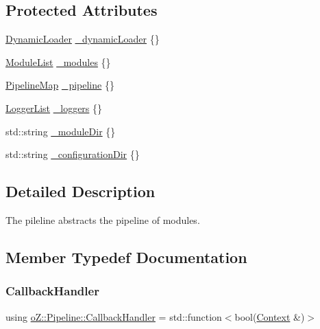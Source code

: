 \subsection*{Protected Attributes}
\begin{DoxyCompactItemize}
\item 
\mbox{\hyperlink{classo_z_1_1_dynamic_loader}{Dynamic\+Loader}} \mbox{\hyperlink{classo_z_1_1_pipeline_a6412859211177d78f0eebcecda79e841}{\+\_\+dynamic\+Loader}} \{\}
\item 
\mbox{\hyperlink{classo_z_1_1_pipeline_a3bb478d291a83763b269d8d27e186a47}{Module\+List}} \mbox{\hyperlink{classo_z_1_1_pipeline_a686d6a56339c5e005f9c4a3e7f0e6e2f}{\+\_\+modules}} \{\}
\item 
\mbox{\hyperlink{classo_z_1_1_pipeline_ae4082276a9a2bafefab47a1298feec67}{Pipeline\+Map}} \mbox{\hyperlink{classo_z_1_1_pipeline_af47abb7bd1c4b9ac8a855458bb045f91}{\+\_\+pipeline}} \{\}
\item 
\mbox{\hyperlink{classo_z_1_1_pipeline_aa1f26badb603f054e554e3ddf8b846b0}{Logger\+List}} \mbox{\hyperlink{classo_z_1_1_pipeline_ad78f1e6302305537f6721e29ece2cc64}{\+\_\+loggers}} \{\}
\item 
std\+::string \mbox{\hyperlink{classo_z_1_1_pipeline_a70093c774bc900349b2c55bbb69b9fb6}{\+\_\+module\+Dir}} \{\}
\item 
std\+::string \mbox{\hyperlink{classo_z_1_1_pipeline_af10d280dfd529f443a081b6d6498c5b9}{\+\_\+configuration\+Dir}} \{\}
\end{DoxyCompactItemize}


\subsection{Detailed Description}
The pileline abstracts the pipeline of modules. 

\subsection{Member Typedef Documentation}
\mbox{\label{classo_z_1_1_pipeline_a5a71ea2f2d4be5b82589c1b8175722f4}} 
\subsubsection{\texorpdfstring{CallbackHandler}{CallbackHandler}}
{\footnotesize\ttfamily using \mbox{\hyperlink{classo_z_1_1_pipeline_a5a71ea2f2d4be5b82589c1b8175722f4}{o\+Z\+::\+Pipeline\+::\+Callback\+Handler}} =  std\+::function$<$bool(\mbox{\hyperlink{classo_z_1_1_context}{Context}} \&)$>$}



